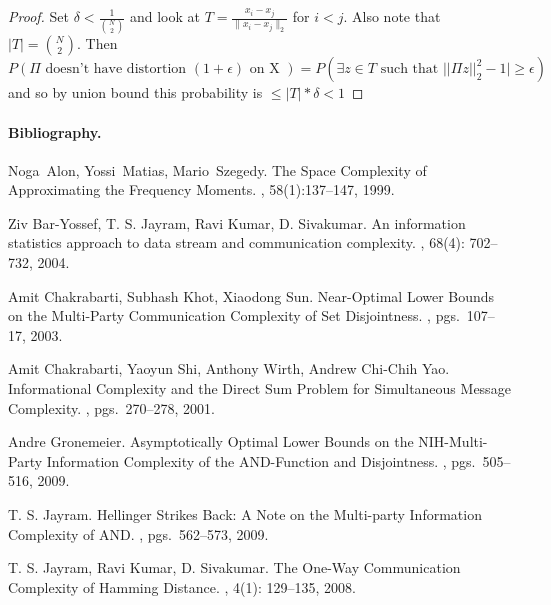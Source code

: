 \documentclass[11pt]{article}
\begin{document}
\begin{proof}
Set $\delta < \frac{1}{{N \choose 2}}$ and look at $T = \frac{x_{i}-x_{j}}{\|x_{i}-x_{j}\|_{2}}$ for $i < j$.  Also note that $|T| = {N \choose 2}$.  Then 
$$P(\Pi \text{ doesn't have distortion } (1+\epsilon) \text{ on X }) = P(\exists z \in T \text{ such that } \big||\Pi z||_2^2 - 1\big| \geq \epsilon)$$
and so by union bound this probability is $\leq |T|*\delta < 1$  
\end{proof}

\paragraph{Bibliography.}




\begin{thebibliography}{42}

Noga~Alon, Yossi~Matias, Mario~Szegedy.
\newblock The Space Complexity of Approximating the Frequency Moments.
, 58(1):137--147, 1999.

Ziv Bar-Yossef, T. S. Jayram, Ravi Kumar, D. Sivakumar.
\newblock An information statistics approach to data stream and communication complexity.
, 68(4): 702--732, 2004.

Amit Chakrabarti, Subhash Khot, Xiaodong Sun.
\newblock Near-Optimal Lower Bounds on the Multi-Party Communication Complexity of Set Disjointness.
, pgs.\ 107--17, 2003.

Amit Chakrabarti, Yaoyun Shi, Anthony Wirth, Andrew Chi-Chih Yao.
\newblock Informational Complexity and the Direct Sum Problem for Simultaneous Message Complexity.
, pgs.\ 270--278, 2001.

Andre Gronemeier.
\newblock Asymptotically Optimal Lower Bounds on the NIH-Multi-Party Information Complexity of the AND-Function and Disjointness. 
, pgs.\ 505--516, 2009.

T. S. Jayram.
\newblock Hellinger Strikes Back: A Note on the Multi-party Information Complexity of AND.
, pgs.\ 562--573, 2009.

T. S. Jayram, Ravi Kumar, D. Sivakumar.
\newblock The One-Way Communication Complexity of Hamming Distance.
, 4(1): 129--135, 2008.


\end{thebibliography}
\end{document}

